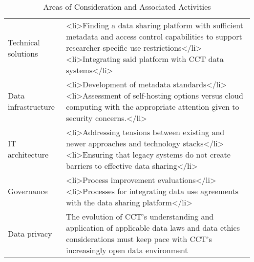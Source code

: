 % 

\begin{table}

\caption{\label{tab:}Areas of Consideration and Associated Activities}
\centering
\begin{tabular}[t]{ll}
\toprule
Technical solutions & <li>Finding a data sharing platform with sufficient metadata and access control capabilities to support researcher-specific use restrictions</li><li>Integrating said platform with CCT data systems</li>\\
Data infrastructure & <li>Development of metadata standards</li><li>Assessment of self-hosting options versus cloud computing with the appropriate attention given to security concerns.</li>\\
IT architecture & <li>Addressing tensions between existing and newer approaches and technology stacks</li><li>Ensuring that legacy systems do not create barriers to effective data sharing</li>\\
Governance & <li>Process improvement evaluations</li><li>Processes for integrating data use agreements with the data sharing platform</li>\\
Data privacy & The evolution of CCT's understanding and application of applicable data laws and data ethics considerations must keep pace with CCT's increasingly open data environment\\
\bottomrule
\end{tabular}
\end{table}